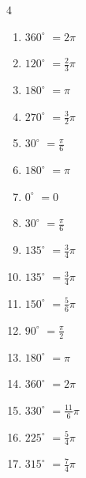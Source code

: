 \begin{multicols}{4}
\begin{enumerate}
  \item $\displaystyle 360^{\circ}$
        $\displaystyle =2\pi$

  \item $\displaystyle 120^{\circ}$
        $\displaystyle =\frac{2}{3}\pi$

  \item $\displaystyle 180^{\circ}$
        $\displaystyle =\pi$

  \item $\displaystyle 270^{\circ}$
        $\displaystyle =\frac{3}{2}\pi$

  \item $\displaystyle 30^{\circ}$
        $\displaystyle =\frac{\pi}{6}$

  \item $\displaystyle 180^{\circ}$
        $\displaystyle =\pi$

  \item $\displaystyle 0^{\circ}$
        $\displaystyle =0$

  \item $\displaystyle 30^{\circ}$
        $\displaystyle =\frac{\pi}{6}$

  \item $\displaystyle 135^{\circ}$
        $\displaystyle =\frac{3}{4}\pi$

\columnbreak %

  \item $\displaystyle 135^{\circ}$
        $\displaystyle =\frac{3}{4}\pi$

  \item $\displaystyle 150^{\circ}$
        $\displaystyle =\frac{5}{6}\pi$

  \item $\displaystyle 90^{\circ}$
        $\displaystyle =\frac{\pi}{2}$

  \item $\displaystyle 180^{\circ}$
        $\displaystyle =\pi$

  \item $\displaystyle 360^{\circ}$
        $\displaystyle =2\pi$

  \item $\displaystyle 330^{\circ}$
        $\displaystyle =\frac{11}{6}\pi$

  \item $\displaystyle 225^{\circ}$
        $\displaystyle =\frac{5}{4}\pi$

  \item $\displaystyle 315^{\circ}$
        $\displaystyle =\frac{7}{4}\pi$


\end{enumerate}
\end{multicols}
